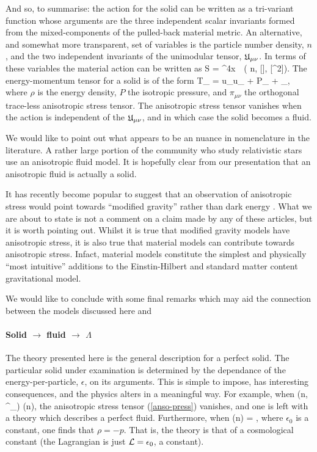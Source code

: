And so, to summarise: the action for the solid can be written as a tri-variant function whose arguments are the three independent scalar invariants formed from the mixed-components of the pulled-back material metric. An alternative, and somewhat more transparent, set of variables is the particle number density, $n$, and the two independent invariants of the unimodular tensor, $\mathfrak{U}_{\mu\nu}$. In terms of these variables the material action can be written as
\bea
S = \int \dd^4x\, \, \rho\left( n, [\rbm{\unimod}], [\rbm{\unimod}^2]\right).
\eea
The energy-momentum tensor for a solid is of the form
\bea
T_{\mu\nu} = \rho u_{\mu}u_{\nu} + P\gamma_{\mu\nu} + \pi_{\mu\nu},
\eea
where $\rho$ is the energy density,  $P$ the isotropic pressure, and $\pi_{\mu\nu}$ the orthogonal trace-less anisotropic stress tensor. The anisotropic stress tensor vanishes when the action is independent of the $\mathfrak{U}_{\mu\nu}$, and in which case the solid becomes a fluid.


We would like to point out what appears to be an nuance in nomenclature in the literature. A rather large portion of the community who study relativistic stars use an anisotropic fluid model. It is hopefully clear from our presentation that an anisotropic fluid is actually a solid.




It has recently become popular to suggest that an observation of anisotropic stress would point towards ``modified gravity'' rather than dark energy \cite{Bellini:2014fua, Saltas:2014dha, Amendola:2014wma, Linder:2014fna}. What we are about to state is not a comment on a claim made by any of these articles, but it is worth pointing out. Whilst it is true that modified gravity models have anisotropic stress, it is also true that material models can contribute towards anisotropic stress. Infact, material models constitute the simplest and physically ``most intuitive'' additions to the Einstin-Hilbert and standard matter content gravitational model.


We would like to conclude with some final remarks which may aid the connection between the models discussed here and 

\paragraph{Solid $\rightarrow$ fluid $\rightarrow$ $\Lambda$}
The theory presented here is the general description for a perfect solid. The particular solid under examination is determined by the dependance of the energy-per-particle, $\epsilon$, on its   arguments. This is simple to impose,   has interesting consequences, and  the physics alters in a meaningful way.  For example, when
\bea
\epsilon\left(n, {\unimod^{\mu}}_{\nu}\right) \longrightarrow \epsilon(n),
\eea
  the anisotropic stress tensor (\ref{anso-press}) vanishes, and one is left with a theory which describes a perfect fluid. Furthermore, when 
\bea
\epsilon(n) = ,
\eea
where $\epsilon_0$ is a constant, one finds that $\rho = - p$.  That is, the theory is that of a cosmological constant (the Lagrangian is just $\mathcal{L} = \epsilon_0$, a constant).

